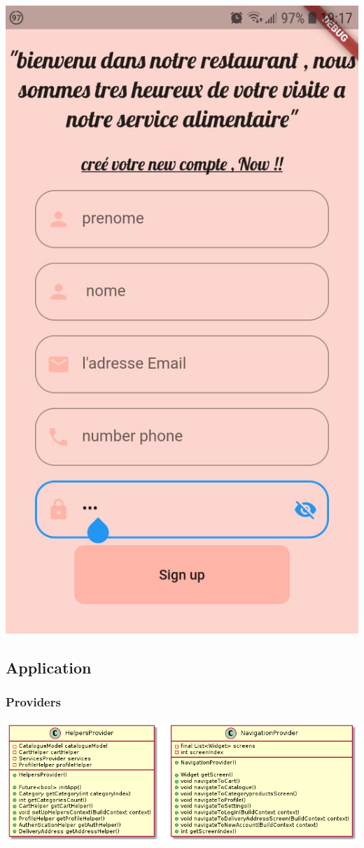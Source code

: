 \documentclass{article}
\begin{document}
\includegraphics[scale=0.3]{./out/MobileApp/Ui/8.png}

\subsection{Application}
\subsubsection{Providers}
\includegraphics[scale=0.5]{./out/MobileApp/Application/Providers/Providers.png}
\end{document}

